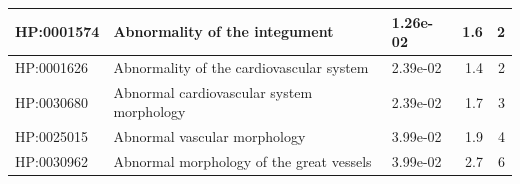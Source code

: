 \documentclass[
]{article}
\begin{document}
\begin{table}
{\begin{tabular}[t]{l|l|l|r|r}
\hline
\hspace{1em}HP:0001574 & Abnormality of the integument & 1.26e-02 & 1.6 & 2\\
\hline
\hspace{1em}HP:0001626 & Abnormality of the cardiovascular system & 2.39e-02 & 1.4 & 2\\
\hline
\hspace{1em}HP:0030680 & Abnormal cardiovascular system morphology & 2.39e-02 & 1.7 & 3\\
\hline
\hspace{1em}HP:0025015 & Abnormal vascular morphology & 3.99e-02 & 1.9 & 4\\
\hline
\hspace{1em}HP:0030962 & Abnormal morphology of the great vessels & 3.99e-02 & 2.7 & 6\\
\hline
\end{tabular}

}

\end{table}%

\newpage
\end{document}
